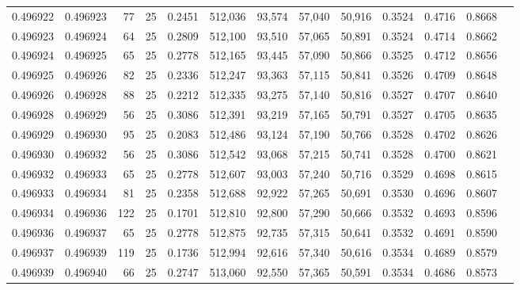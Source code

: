 \begin{tabular}{rrrrrrrrrrrrr}
0.496922 & 0.496923 &    77 &  25 &                                     0.2451 & 512,036 &  93,574 &  57,040 &  50,916 & 0.3524 & 0.4716 & 0.8668 \\
0.496923 & 0.496924 &    64 &  25 &                                     0.2809 & 512,100 &  93,510 &  57,065 &  50,891 & 0.3524 & 0.4714 & 0.8662 \\
0.496924 & 0.496925 &    65 &  25 &                                     0.2778 & 512,165 &  93,445 &  57,090 &  50,866 & 0.3525 & 0.4712 & 0.8656 \\
0.496925 & 0.496926 &    82 &  25 &                                     0.2336 & 512,247 &  93,363 &  57,115 &  50,841 & 0.3526 & 0.4709 & 0.8648 \\
0.496926 & 0.496928 &    88 &  25 &                                     0.2212 & 512,335 &  93,275 &  57,140 &  50,816 & 0.3527 & 0.4707 & 0.8640 \\
0.496928 & 0.496929 &    56 &  25 &                                     0.3086 & 512,391 &  93,219 &  57,165 &  50,791 & 0.3527 & 0.4705 & 0.8635 \\
0.496929 & 0.496930 &    95 &  25 &                                     0.2083 & 512,486 &  93,124 &  57,190 &  50,766 & 0.3528 & 0.4702 & 0.8626 \\
0.496930 & 0.496932 &    56 &  25 &                                     0.3086 & 512,542 &  93,068 &  57,215 &  50,741 & 0.3528 & 0.4700 & 0.8621 \\
0.496932 & 0.496933 &    65 &  25 &                                     0.2778 & 512,607 &  93,003 &  57,240 &  50,716 & 0.3529 & 0.4698 & 0.8615 \\
0.496933 & 0.496934 &    81 &  25 &                                     0.2358 & 512,688 &  92,922 &  57,265 &  50,691 & 0.3530 & 0.4696 & 0.8607 \\
0.496934 & 0.496936 &   122 &  25 &                                     0.1701 & 512,810 &  92,800 &  57,290 &  50,666 & 0.3532 & 0.4693 & 0.8596 \\
0.496936 & 0.496937 &    65 &  25 &                                     0.2778 & 512,875 &  92,735 &  57,315 &  50,641 & 0.3532 & 0.4691 & 0.8590 \\
0.496937 & 0.496939 &   119 &  25 &                                     0.1736 & 512,994 &  92,616 &  57,340 &  50,616 & 0.3534 & 0.4689 & 0.8579 \\
0.496939 & 0.496940 &    66 &  25 &                                     0.2747 & 513,060 &  92,550 &  57,365 &  50,591 & 0.3534 & 0.4686 & 0.8573 \\

\end{tabular}
